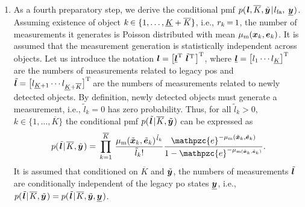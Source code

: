 \documentclass[11pt,a4paper]{article}
\newcommand{\ist}{\hspace*{.3mm}}
\newcommand{\rmv}{\hspace*{-.3mm}}
\newcommand{\T}{\text{T}}
\begin{document}
\begin{enumerate}
\item As a fourth preparatory step, we derive the conditional \ac{pmf} $p( \ist \V{l},  \overline{K}, \tilde{\V{y}} \ist | \ist l_{\mathrm{fa}},$ $\underline{\V{y}}  \ist)$. Assuming existence of object $k \rmv\in \{1,\dots,\underline{K} + \overline{K}\}$, i.e., $r_k \rmv=\rmv 1$, the number of measurements it generates is Poisson distributed with mean $\mu_{\mathrm{m}}(\bm{x}_k,\bm{e}_k)$. It is assumed \cite{MeyKroWilLauHlaBraWin:J18,GraFatSve:J19} that the measurement generation is statistically independent across objects. Let us introduce the notation $\V{l} = \big[\underline{\V{l}}^{\T} \ist\ist\ist\ist \tilde{\V{l}}^{\ist\T} \ist\big]^{\T}$\rmv\rmv\rmv, where $\underline{\V{l}}  = \big[l_1 \cdots l_{\underline{K}}  \big]^{\T}$ are the numbers of measurements related to legacy \acp{po} and  $\tilde{\V{l}}  = \big[ l_{\underline{K} + 1} \cdots  l_{\underline{K} + \overline{K}}  \big]^{\T}\rmv\rmv$ are the numbers of measurements related to newly detected objects. By definition, newly detected objects  must generate a measurement, i.e., $\tilde{l}_k = 0$ has zero probability. Thus, for all $\tilde{l}_k > 0$, $k \in \{1,\dots,\overline{K}\}$ the conditional \ac{pmf} $p( \ist \tilde{\V{l}} \ist | \ist \overline{K}, \tilde{\V{y}} \ist) $ can be expressed \vspace{-1mm} as
\begin{equation}
p( \ist \tilde{\V{l}} \ist | \ist \overline{K}, \tilde{\V{y}}\ist)= \ist\ist\prod^{ \overline{K}}_{k= 1 }\ist\ist \frac{\mu_{\mathrm{m}}(\tilde{\V{x}}_{k},\tilde{\V{e}}_{k})^{\ist \tilde{l}_{k}}}{\tilde{l}_{k}!} \frac{\mathpzc{e}^{-\mu_{\mathrm{m}}(\tilde{\V{x}}_{k},\tilde{\V{e}}_{k})}}{1-\mathpzc{e}^{-\mu_{\mathrm{m}(\tilde{\V{x}}_{k},\tilde{\V{e}}_{k})}}}. \label{eq:condPMF}
\vspace{-1mm}
\end{equation}
It is assumed \cite{MeyKroWilLauHlaBraWin:J18,GraFatSve:J19} that conditioned on $\overline{K}$ and $\tilde{\bm{y}}$, the numbers of measurements $\tilde{\bm{l}}$ are conditionally independent of the legacy \ac{po} states $\underline{\bm{y}}$, i.e., $p( \ist \tilde{\V{l}} \ist | \ist \overline{K}, \tilde{\V{y}}\ist) = p( \ist \tilde{\V{l}} \ist | \ist \overline{K}, \tilde{\V{y}}, \underline{\V{y}}\ist)$.


\end{enumerate}
\end{document}
